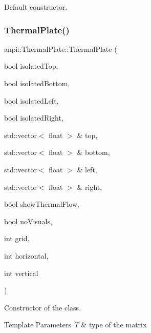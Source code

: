 Default constructor. 

\mbox{\label{classanpi_1_1ThermalPlate_ac48332c6a6deef37d73a60a1cf6fe3b7}} 
\subsubsection{\texorpdfstring{Thermal\+Plate()}{ThermalPlate()}\hspace{0.1cm}{\footnotesize\ttfamily [2/2]}}
{\footnotesize\ttfamily anpi\+::\+Thermal\+Plate\+::\+Thermal\+Plate (\begin{DoxyParamCaption}\item[{bool}]{isolated\+Top,  }\item[{bool}]{isolated\+Bottom,  }\item[{bool}]{isolated\+Left,  }\item[{bool}]{isolated\+Right,  }\item[{std\+::vector$<$ float $>$ \&}]{top,  }\item[{std\+::vector$<$ float $>$ \&}]{bottom,  }\item[{std\+::vector$<$ float $>$ \&}]{left,  }\item[{std\+::vector$<$ float $>$ \&}]{right,  }\item[{bool}]{show\+Thermal\+Flow,  }\item[{bool}]{no\+Visuals,  }\item[{int}]{grid,  }\item[{int}]{horizontal,  }\item[{int}]{vertical }\end{DoxyParamCaption})\hspace{0.3cm}{\ttfamily [inline]}}

Constructor of the class. 
\begin{DoxyTemplParams}{Template Parameters}
{\em T} & type of the matrix \\
\hline
\end{DoxyTemplParams}

